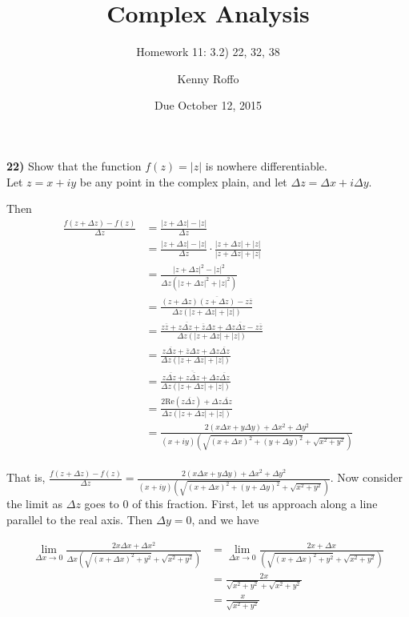 \documentclass{scrartcl}
\title{Complex Analysis}
\subtitle{Homework 11: 3.2) 22, 32, 38}
\author{Kenny Roffo}
\date{Due October 12, 2015}
\begin{document}
\maketitle

\textbf{22)} Show that the function $f(z)=|z|$ is nowhere differentiable.\\

Let $z=x+iy$ be any point in the complex plain, and let $\Delta z = \Delta x + i \Delta y$.

Then 
\begin{align*}
  \frac{f(z+\Delta z) - f(z)}{\Delta z} &= \frac{|z + \Delta z| - |z|}{\Delta z}\\
  &= \frac{|z + \Delta z| - |z|}{\Delta z} \cdot \frac{|z + \Delta z| + |z|}{|z + \Delta z| + |z|}\\
  &= \frac{|z + \Delta z|^2 - |z|^2}{\Delta z (|z + \Delta z|^2 + |z|^2)}\\
  &= \frac{(z + \Delta z)\overline{(z + \Delta z)} - z\overline{z}}{\Delta z(|z + \Delta z| + |z|)}\\
  &= \frac{z\overline{z} + z\overline{\Delta z} + \overline{z}\Delta z + \Delta z \overline{\Delta z} - z\overline{z}}{\Delta z(|z + \Delta z| + |z|)}\\
  &= \frac{z\overline{\Delta z} + \overline{z}\Delta z + \Delta z \overline{\Delta z}}{\Delta z(|z + \Delta z| + |z|)}\\
  &= \frac{z\overline{\Delta z} + \overline{z\overline{\Delta z}} + \Delta z \overline{\Delta z}}{\Delta z(|z + \Delta z| + |z|)}\\
  &= \frac{2\text{Re}(z\overline{\Delta z}) + \Delta z \overline{\Delta z}}{\Delta z(|z + \Delta z| + |z|)}\\
  &= \frac{2(x\Delta x + y\Delta y) + \Delta x^2 + \Delta y^2}{(x + iy)(\sqrt{(x + \Delta x)^2+(y + \Delta y)^2} + \sqrt{x^2 + y^2})}\\
\end{align*}
 
That is, $\frac{f(z+\Delta z) - f(z)}{\Delta z} = \frac{2(x\Delta x + y\Delta y) + \Delta x^2 + \Delta y^2}{(x + iy)(\sqrt{(x + \Delta x)^2+(y + \Delta y)^2} + \sqrt{x^2 + y^2})}$. Now consider the limit as $\Delta z$ goes to 0 of this fraction. First, let us approach along a line parallel to the real axis. Then $\Delta y = 0$, and we have

\begin{align*}
  \lim_{\Delta x \rightarrow 0} \frac{2x\Delta x + \Delta x^2}{\Delta x (\sqrt{(x + \Delta x)^2 + y^2} + \sqrt{x^2 + y^2})} &= \lim_{\Delta x \rightarrow 0}\frac{2x + \Delta x}{(\sqrt{(x+\Delta x)^2 + y^2} + \sqrt{x^2 + y^2})}\\
  &= \frac{2x}{\sqrt{x^2 + y^2} + \sqrt{x^2 + y^2}}\\
  &= \frac{x}{\sqrt{x^2 + y^2}}
\end{align*}
\end{document}
